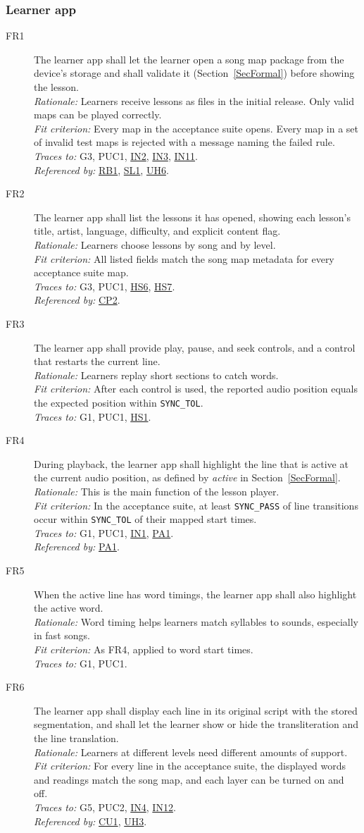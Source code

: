 \documentclass[12pt]{article}
\newcommand{\cn}[1]{\texttt{#1}}
\newcommand{\rat}[1]{\\\textit{Rationale:} #1}
\newcommand{\fit}[1]{\\\textit{Fit criterion:} #1}
\newcommand{\trace}[1]{\\\textit{Traces to:} #1}
\newcommand{\usedby}[1]{\\\textit{Referenced by:} #1}
\newcommand{\reqdef}[1]{\hypertarget{req:#1}{#1}}
\newcommand{\req}[1]{\hyperlink{req:#1}{#1}}
\begin{document}
\subsubsection*{Learner app}
\begin{description}
\item[\reqdef{FR1}] The learner app shall let the learner open a song map package from
the device's storage and shall validate it (Section~\ref{SecFormal}) before
showing the lesson.
\rat{Learners receive lessons as files in the initial release. Only valid maps
can be played correctly.}
\fit{Every map in the acceptance suite opens. Every map in a set of invalid
test maps is rejected with a message naming the failed rule.}
\trace{G3, PUC1, \req{IN2}, \req{IN3}, \req{IN11}.}
\usedby{\req{RB1}, \req{SL1}, \req{UH6}.}

\item[\reqdef{FR2}] The learner app shall list the lessons it has opened, showing each
lesson's title, artist, language, difficulty, and explicit content flag.
\rat{Learners choose lessons by song and by level.}
\fit{All listed fields match the song map metadata for every acceptance suite
map.}
\trace{G3, PUC1, \req{HS6}, \req{HS7}.}
\usedby{\req{CP2}.}

\item[\reqdef{FR3}] The learner app shall provide play, pause, and seek controls, and
a control that restarts the current line.
\rat{Learners replay short sections to catch words.}
\fit{After each control is used, the reported audio position equals the
expected position within \cn{SYNC\_TOL}.}
\trace{G1, PUC1, \req{HS1}.}

\item[\reqdef{FR4}] During playback, the learner app shall highlight the line that is
active at the current audio position, as defined by \textit{active} in
Section~\ref{SecFormal}.
\rat{This is the main function of the lesson player.}
\fit{In the acceptance suite, at least \cn{SYNC\_PASS} of line transitions
occur within \cn{SYNC\_TOL} of their mapped start times.}
\trace{G1, PUC1, \req{IN1}, \req{PA1}.}
\usedby{\req{PA1}.}

\item[\reqdef{FR5}] When the active line has word timings, the learner app shall also
highlight the active word.
\rat{Word timing helps learners match syllables to sounds, especially in fast
songs.}
\fit{As FR4, applied to word start times.}
\trace{G1, PUC1.}

\item[\reqdef{FR6}] The learner app shall display each line in its original script with
the stored segmentation, and shall let the learner show or hide the
transliteration and the line translation.
\rat{Learners at different levels need different amounts of support.}
\fit{For every line in the acceptance suite, the displayed words and readings
match the song map, and each layer can be turned on and off.}
\trace{G5, PUC2, \req{IN4}, \req{IN12}.}
\usedby{\req{CU1}, \req{UH3}.}


\end{description}
\end{document}
